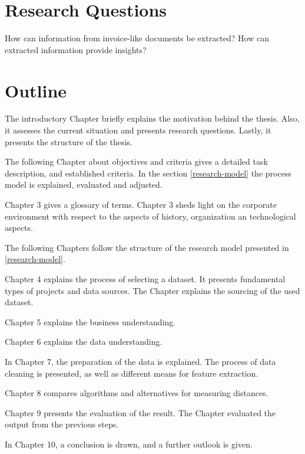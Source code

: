\section{Research Questions}
\label{section:research-q}
How can information from invoice-like documents be extracted?
How can extracted information provide insights?

\section{Outline}
The introductory Chapter briefly explains the motivation behind the thesis. Also, it assesses the current situation and presents research questions. Lastly, it presents the structure of the thesis.

The following Chapter about objectives and criteria gives a detailed task description, and established criteria. In the section \ref{research-model} the process model is explained, evaluated and adjusted.

Chapter 3 gives a glossary of terms. Chapter 3 sheds light on the corporate environment with respect to the aspects of history, organization an technological aspects. 

The following Chapters follow the structure of the research model presented in \ref{research-model}.

Chapter 4 explains the process of selecting a dataset. It presents fundamental types of projects and data sources. The Chapter explains the sourcing of the used dataset.

Chapter 5 explains the business understanding.

Chapter 6 explains the data understanding.

In Chapter 7, the preparation of the data is explained. The process of data cleaning is presented, as well as different means for feature extraction.

Chapter 8 compares algorithms and alternatives for measuring distances.

Chapter 9 presents the evaluation of the result. The Chapter evaluated the output from the previous steps.

In Chapter 10, a conclusion is drawn, and a further outlook is given.